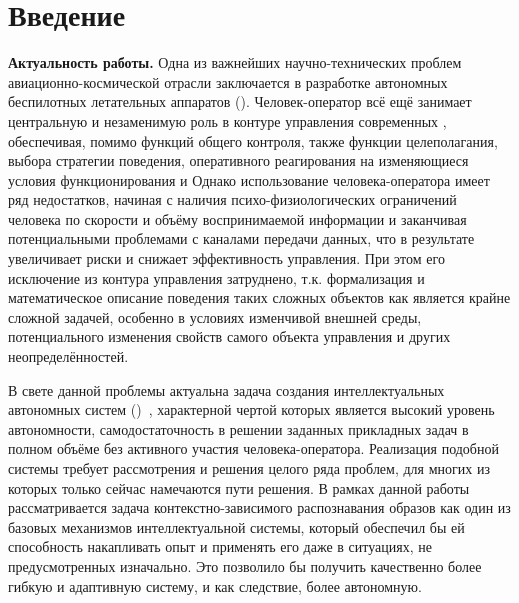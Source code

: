\chapter*{Введение} \label{introduction}

\textbf{Актуальность работы.} Одна из важнейших научно-технических проблем авиационно-космической отрасли заключается в разработке автономных беспилотных летательных аппаратов (). Человек-оператор всё ещё занимает центральную и незаменимую роль в контуре управления современных , обеспечивая, помимо функций общего контроля, также функции целеполагания, выбора стратегии поведения, оперативного реагирования на изменяющиеся условия функционирования и \other Однако использование человека-оператора имеет ряд недостатков, начиная с наличия психо-физиологических ограничений человека по скорости и объёму воспринимаемой информации и заканчивая потенциальными проблемами с каналами передачи данных, что в результате увеличивает риски и снижает эффективность управления. При этом его исключение из контура управления затруднено, т.к. формализация и математическое описание поведения таких сложных объектов как  является крайне сложной задачей, особенно в условиях изменчивой внешней среды, потенциального изменения свойств самого объекта управления и других неопределённостей.

В свете данной проблемы актуальна задача создания \socalled интеллектуальных автономных систем ()~\cite{Tiumentsev2002-KII}, характерной чертой которых является высокий уровень автономности, \ie самодостаточность в решении заданных прикладных задач в полном объёме без активного участия человека-оператора. Реализация подобной системы требует рассмотрения и решения целого ряда проблем, для многих из которых только сейчас намечаются пути решения. В рамках данной работы рассматривается задача контекстно-зависимого распознавания образов как один из базовых механизмов интеллектуальной системы, который обеспечил бы ей способность накапливать опыт и применять его даже в ситуациях, не предусмотренных изначально. Это позволило бы получить качественно более гибкую и адаптивную систему, и как следствие, более автономную.

